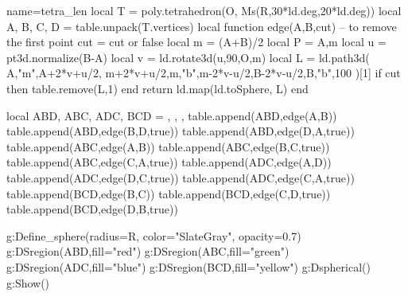 \documentclass[border=2pt]{standalone}
\begin{document}
\begin{luadraw}{name=tetra_len}
local T = poly.tetrahedron(O, Ms(R,30*ld.deg,20*ld.deg))
local A, B, C, D = table.unpack(T.vertices)
local function edge(A,B,cut) -- to remove the first point
    cut = cut or false
    local m = (A+B)/2
    local  P = {A,m}
    local u = pt3d.normalize(B-A)
    local v = ld.rotate3d(u,90,{O,m})
    local L = ld.path3d( {A,"m",A+2*v+u/2, m+2*v+u/2,m,"b",m-2*v-u/2,B-2*v-u/2,B,"b"},100 )[1]
    if cut then table.remove(L,1) end
    return ld.map(ld.toSphere, L)
end

local ABD, ABC, ADC, BCD = {}, {}, {}, {}
table.append(ABD,edge(A,B))
table.append(ABD,edge(B,D,true))
table.append(ABD,edge(D,A,true))
table.append(ABC,edge(A,B))
table.append(ABC,edge(B,C,true))
table.append(ABC,edge(C,A,true))
table.append(ADC,edge(A,D))
table.append(ADC,edge(D,C,true))
table.append(ADC,edge(C,A,true))
table.append(BCD,edge(B,C))
table.append(BCD,edge(C,D,true))
table.append(BCD,edge(D,B,true))

g:Define_sphere({radius=R, color="SlateGray", opacity=0.7})
g:DSregion(ABD,{fill="red"})
g:DSregion(ABC,{fill="green"})
g:DSregion(ADC,{fill="blue"})
g:DSregion(BCD,{fill="yellow"})
g:Dspherical()
g:Show()
\end{luadraw}
\end{document}
